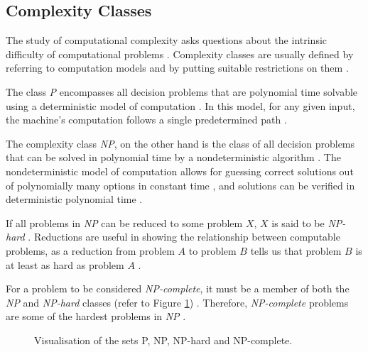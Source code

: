 \documentclass[a4paper, 12pt]{extreport}
\begin{document}
	\subsection{Complexity Classes}\label{subsec:compclass}
	
	The study of computational complexity asks questions about the intrinsic difficulty of computational problems \cite{cc:conceptual-perspective}. Complexity classes are usually defined by referring to computation models and by putting suitable restrictions on them \cite{uniform-cc}. 
	
	The class \textit{P} encompasses all decision problems that are polynomial time solvable using a deterministic model of computation \cite{cc:modern}. In this model, for any given input, the machine's computation follows a single predetermined path \cite{sipser-intro-to-computation}. 
	
	The complexity class \textit{NP}, on the other hand is the class of all decision problems that can be solved in polynomial time by a nondeterministic algorithm \cite{computers-and-intractability}. The nondeterministic model of computation allows for guessing correct solutions out of polynomially many options in constant time \cite{npcompleteness}, and solutions can be verified in deterministic polynomial time \cite{sipser-intro-to-computation}.
	
	If all problems in \textit{NP} can be reduced to some problem $X$, $X$ is said to be \textit{NP-hard} \cite{sipser-intro-to-computation}. Reductions are useful in showing the relationship between computable problems, as a reduction from problem $A$ to problem $B$ tells us that problem $B$ is at least as hard as problem $A$ \cite{npcompleteness}.
	
	For a problem to be considered \textit{NP-complete}, it must be a member of both the \textit{NP} and \textit{NP-hard} classes (refer to Figure \ref{fig:p,np,npcomplete}) \cite{npcompleteness}. Therefore, \textit{NP-complete} problems are some of the hardest problems in \textit{NP} \cite{cc:modern}.
	
	\begin{figure}
		\centering
		\begin{adjustbox}{max width=\linewidth}
		\end{adjustbox}
		\caption{\centering Visualisation of the sets P, NP, NP-hard and NP-complete.}
		\label{fig:p,np,npcomplete}
	\end{figure}
	
\end{document}
